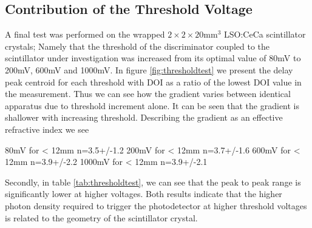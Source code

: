 \subsection{Contribution of the Threshold Voltage}

A final test was performed on the wrapped $2\times2\times20$mm$^3$ LSO:CeCa scintillator crystals; Namely that the threshold of the discriminator coupled to the scintillator under investigation was increased from its optimal value of 80mV to 200mV, 600mV and 1000mV. In figure \ref{fig:thresholdtest} we present the delay peak centroid for each threshold with DOI as a ratio of the lowest DOI value in the measurement. Thus we can see how the gradient varies between identical apparatus due to threshold increment alone. It can be seen that the gradient is shallower with increasing threshold. Describing the gradient as an effective refractive index we see


80mV for < 12mm n=3.5+/-1.2
200mV for < 12mm n=3.7+/-1.6
600mV for < 12mm n=3.9+/-2.2
1000mV for < 12mm n=3.9+/-2.1


Secondly, in table \ref{tab:thresholdtest}, we can see that the peak to peak range is significantly lower at higher voltages. Both results indicate that the higher photon density required to trigger the photodetector at higher threshold voltages is related to the geometry of the scintillator crystal.

